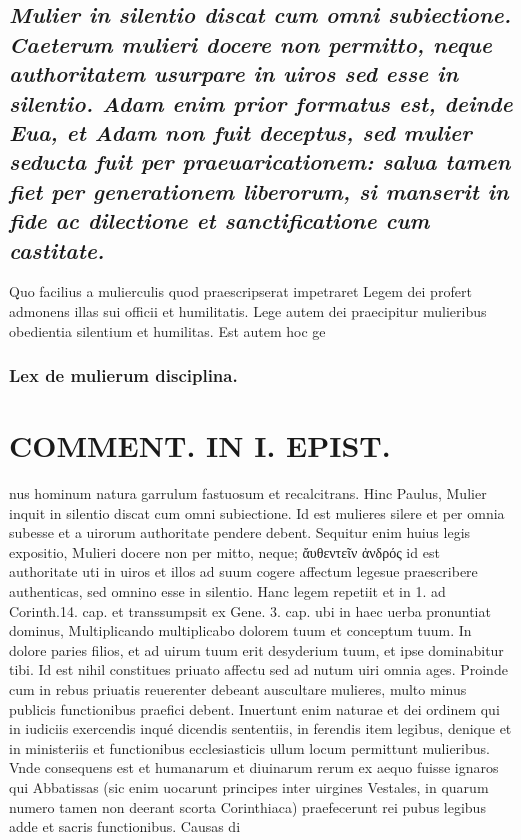 \documentclass{article}
\begin{document}
\begin{pages}
\subsection*{\textit{Mulier in silentio discat cum omni subiectione. Caeterum mulieri docere non permitto, neque authoritatem usurpare in uiros sed esse in silentio. Adam enim prior formatus est, deinde Eua, et Adam non fuit deceptus, sed mulier seducta fuit per praeuaricationem: salua tamen fiet per generationem liberorum, si manserit in fide ac dilectione et sanctificatione cum castitate. }}\pstart Quo facilius a mulierculis quod praescripserat impetraret Legem dei profert admonens illas sui officii et humilitatis. Lege autem dei praecipitur mulieribus obedientia silentium et humilitas. Est autem hoc ge\pend
\subsubsection*{Lex de mulierum disciplina. }
\section*{COMMENT. IN I. EPIST. }\pstart nus hominum natura garrulum fastuosum et recalcitrans. Hinc Paulus, Mulier inquit in silentio discat cum omni subiectione. Id est mulieres silere et per omnia subesse et a uirorum authoritate pendere debent. Sequitur enim huius legis expositio, Mulieri docere non per mitto, neque; ἄυθεντεῖν ἀνδρός id est authoritate uti in uiros et illos ad suum cogere affectum legesue praescribere authenticas, sed omnino esse in silentio. Hanc legem repetiit et in 1. ad Corinth.14. cap. et transsumpsit ex Gene. 3. cap. ubi in haec uerba pronuntiat dominus, Multiplicando multiplicabo dolorem tuum et conceptum tuum. In dolore paries filios, et ad uirum tuum erit desyderium tuum, et ipse dominabitur tibi. Id est nihil constitues priuato affectu sed ad nutum uiri omnia ages. Proinde cum in rebus priuatis reuerenter debeant auscultare mulieres, multo minus publicis functionibus praefici debent. Inuertunt enim naturae et dei ordinem qui in iudiciis exercendis inqué dicendis sententiis, in ferendis item legibus, denique et in ministeriis et functionibus ecclesiasticis ullum locum permittunt mulieribus. Vnde consequens est et humanarum et diuinarum rerum ex aequo fuisse ignaros qui Abbatissas (sic enim uocarunt principes inter uirgines Vestales, in quarum numero tamen non deerant scorta Corinthiaca) praefecerunt rei pubus  legibus adde et sacris functionibus. Causas di\pend

\end{pages}
\end{document}
